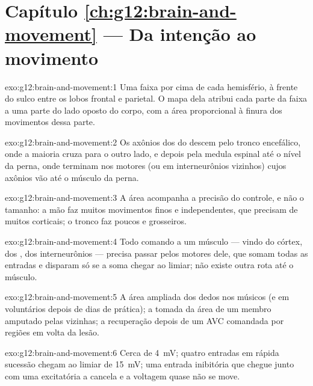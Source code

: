 \section*{Capítulo \ref{ch:g12:brain-and-movement} --- Da intenção ao movimento}

\begin{solution}{exo:g12:brain-and-movement:1}
Uma faixa por cima de cada hemisfério, à frente do sulco entre os lobos
frontal e parietal. O mapa dela atribui cada parte da faixa a uma parte
do lado oposto do corpo, com a área proporcional à finura dos
movimentos dessa parte.
\end{solution}

\begin{solution}{exo:g12:brain-and-movement:2}
Os axônios dos  do  descem pelo tronco encefálico,
onde a maioria cruza para o outro lado, e depois pela medula espinal
até o nível da perna, onde terminam nos  motores (ou em
interneurônios vizinhos) cujos axônios vão até o músculo da perna.
\end{solution}

\begin{solution}{exo:g12:brain-and-movement:3}
A área acompanha a precisão do controle, e não o tamanho: a mão faz
muitos movimentos finos e independentes, que precisam de muitos
 corticais; o tronco faz poucos e grosseiros.
\end{solution}

\begin{solution}{exo:g12:brain-and-movement:4}
Todo comando a um músculo --- vindo do córtex, dos , dos
interneurônios --- precisa passar pelos  motores dele, que
somam todas as entradas e disparam só se a soma chegar ao limiar; não
existe outra rota até o músculo.
\end{solution}

\begin{solution}{exo:g12:brain-and-movement:5}
A área ampliada dos dedos nos músicos (e em voluntários depois de dias
de prática); a tomada da área de um membro amputado pelas vizinhas; a
recuperação depois de um AVC comandada por regiões em volta da lesão.
\end{solution}

\begin{solution}{exo:g12:brain-and-movement:6}
Cerca de \qty{4}{mV}; quatro entradas em rápida sucessão chegam ao
limiar de \qty{15}{mV}; uma entrada inibitória que chegue junto com uma
excitatória a cancela e a voltagem quase não se move.
\end{solution}

